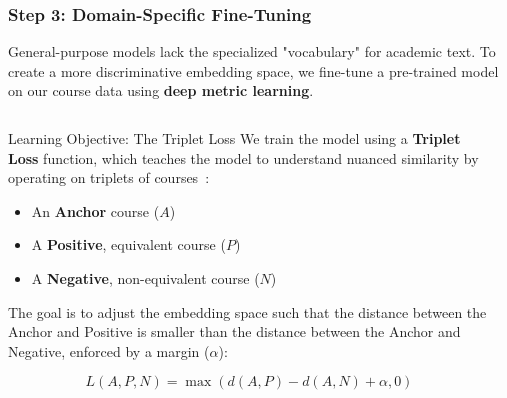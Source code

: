 \documentclass[aspectratio=169,10pt]{beamer}
\begin{document}
\begin{frame}
    \frametitle{Step 3: Domain-Specific Fine-Tuning}
    
    General-purpose models lack the specialized "vocabulary" for academic text. To create a more discriminative embedding space, we fine-tune a pre-trained model on our course data using \textbf{deep metric learning}.
    
    \fontsize{9}{9}\selectfont
    \begin{columns}[T]
        \begin{column}{0.55\textwidth}
            \begin{alertblock}{Learning Objective: The Triplet Loss}
                We train the model using a \textbf{Triplet Loss} function, which teaches the model to understand nuanced similarity by operating on triplets of courses~\cite{Schroff_2015_CVPR, hermans2017defensetripletlossperson}:
                \begin{itemize}
                    \item An \textbf{Anchor} course (\(A\))
                    \item A \textbf{Positive}, equivalent course (\(P\))
                    \item A \textbf{Negative}, non-equivalent course (\(N\))
                \end{itemize}
                
                \vspace{0.5em}
                The goal is to adjust the embedding space such that the distance between the Anchor and Positive is smaller than the distance between the Anchor and Negative, enforced by a margin (\(\alpha\)):
                
                \[ L(A, P, N) = \max\left(d(A, P) - d(A, N) + \alpha, 0\right) \]
            \end{alertblock}
        \end{column}
        
        \begin{column}{0.4\textwidth}
            

\end{column}
\end{columns}
\end{frame}
\end{document}
